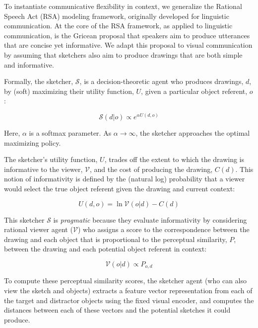 \documentclass[manuscript]{stjour}
\begin{document}
To instantiate communicative flexibility in context, we generalize the Rational Speech Act (RSA) modeling framework, originally developed for linguistic communication. At the core of the RSA framework, as applied to linguistic communication, is the Gricean proposal that speakers aim to produce utterances that are concise yet informative. We adapt this proposal to visual communication by assuming that sketchers also aim to produce drawings that are both simple and informative. 

Formally, the sketcher, $\mathcal{S}$, is a decision-theoretic agent who produces drawings, $d$, by (soft) maximizing their utility function, $U$, given a particular object referent, $o$: 

\begin{equation}
\mathcal{S}(d|o) \propto e^{\alpha U(d,o)}
\end{equation}

Here, $\alpha$ is a softmax parameter. As $\alpha \rightarrow \infty$, the sketcher approaches the optimal maximizing policy. 

The sketcher's utility function, $U$, trades off the extent to which the drawing is informative to the viewer, $\mathcal{V}$, and the cost of producing the drawing, $C(d)$. This notion of informativity is defined by the (natural log) probability that a viewer would select the true object referent given the drawing and current context:

\begin{equation} \label{sketcher_utility}
U(d, o) = \ln \mathcal{V}(o|d) - C(d)
\end{equation}

This sketcher $\mathcal{S}$ is \emph{pragmatic} because they evaluate informativity by considering rational viewer agent ($\mathcal{V}$) who assigns a score to the correspondence between the drawing and each object that is proportional to the perceptual similarity, $P$, between the drawing and each potential object referent in context:

\begin{equation} \label{literal_viewer_score}
\mathcal{V}(o|d) \propto P_{o,d}
\end{equation}

To compute these perceptual similarity scores, the sketcher agent (who can also view the sketch and objects) extracts a feature vector representation from each of the target and distractor objects using the fixed visual encoder, and computes the distances between each of these vectors and the potential sketches it could produce. 
\end{document}
